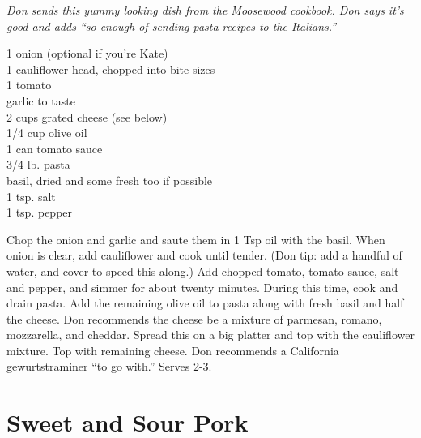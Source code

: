 \textit{Don sends this yummy looking dish from the Moosewood cookbook. Don says
it's good and adds ``so enough of sending pasta recipes to the Italians.''}
\begin{ingredients}
1 onion (optional if you're Kate)\\
1 cauliflower head, chopped into bite sizes\\
1 tomato\\
garlic to taste\\
2 cups grated cheese (see below)\\
1/4 cup olive oil\\
1 can tomato sauce\\
3/4 lb. pasta\\
basil, dried and some fresh too if possible\\
1 tsp. salt\\
1 tsp. pepper
\end{ingredients}
Chop the onion and garlic and saute them in 1 Tsp oil with the basil. When
onion is clear, add cauliflower and cook until tender. (Don tip: add a
handful of water, and cover to speed this along.) Add chopped tomato,
tomato sauce, salt and pepper, and simmer for about twenty minutes. During
this time, cook and drain pasta. Add the remaining olive oil to pasta
along with fresh basil and half the cheese. Don recommends the cheese be
a mixture of parmesan, romano, mozzarella, and cheddar. Spread this on a big
platter and top with the cauliflower mixture. Top with remaining cheese. Don
recommends a California gewurtstraminer ``to go with.''  Serves 2-3.

\section{Sweet and Sour Pork}

